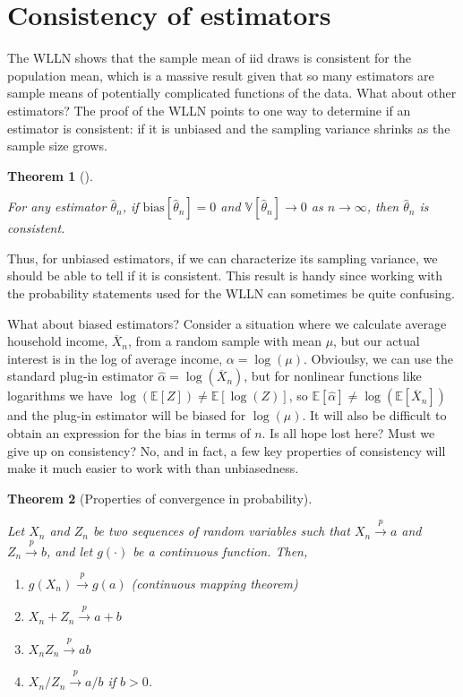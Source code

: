 \documentclass[
  letterpaper,
  DIV=11,
  numbers=noendperiod]{scrreprt}
\providecommand{\tightlist}{%
  \setlength{\itemsep}{0pt}\setlength{\parskip}{0pt}}\usepackage{longtable,booktabs,array}
\newcommand{\E}{\mathbb{E}}
\newcommand{\V}{\mathbb{V}}
\newcommand{\Xbar}{\overline{X}}
\newcommand{\inprob}{\overset{p}{\to}}
\theoremstyle{definition}
\theoremstyle{definition}
\theoremstyle{plain}
\newtheorem{theorem}{Theorem}[chapter]
\theoremstyle{remark}
\begin{document}
\hypertarget{consistency-of-estimators}{%
\section{Consistency of estimators}\label{consistency-of-estimators}}

The WLLN shows that the sample mean of iid draws is consistent for the
population mean, which is a massive result given that so many estimators
are sample means of potentially complicated functions of the data. What
about other estimators? The proof of the WLLN points to one way to
determine if an estimator is consistent: if it is unbiased and the
sampling variance shrinks as the sample size grows.

\begin{theorem}[]\protect\hypertarget{thm-consis}{}\label{thm-consis}

For any estimator \(\widehat{\theta}_n\), if
\(\text{bias}[\widehat{\theta}_n] = 0\) and
\(\V[\widehat{\theta}_n] \rightarrow 0\) as \(n\rightarrow \infty\),
then \(\widehat{\theta}_n\) is consistent.

\end{theorem}

Thus, for unbiased estimators, if we can characterize its sampling
variance, we should be able to tell if it is consistent. This result is
handy since working with the probability statements used for the WLLN
can sometimes be quite confusing.

What about biased estimators? Consider a situation where we calculate
average household income, \(\Xbar_n\), from a random sample with mean
\(\mu\), but our actual interest is in the log of average income,
\(\alpha = \log(\mu)\). Obvioulsy, we can use the standard plug-in
estimator \(\widehat{\alpha} = \log(\Xbar_n)\), but for nonlinear
functions like logarithms we have
\(\log\left(\E[Z]\right) \neq \E[\log(Z)]\), so
\(\E[\widehat{\alpha}] \neq \log(\E[\Xbar_n])\) and the plug-in
estimator will be biased for \(\log(\mu)\). It will also be difficult to
obtain an expression for the bias in terms of \(n\). Is all hope lost
here? Must we give up on consistency? No, and in fact, a few key
properties of consistency will make it much easier to work with than
unbiasedness.

\begin{theorem}[Properties of convergence in
probability]\protect\hypertarget{thm-inprob-properties}{}\label{thm-inprob-properties}

Let \(X_n\) and \(Z_n\) be two sequences of random variables such that
\(X_n \inprob a\) and \(Z_n \inprob b\), and let \(g(\cdot)\) be a
continuous function. Then,

\begin{enumerate}
\def\labelenumi{\arabic{enumi}.}
\tightlist
\item
  \(g(X_n) \inprob g(a)\) (continuous mapping theorem)
\item
  \(X_n + Z_n \inprob a + b\)
\item
  \(X_nZ_n \inprob ab\)
\item
  \(X_n/Z_n \inprob a/b\) if \(b > 0\).
\end{enumerate}

\end{theorem}
\end{document}
